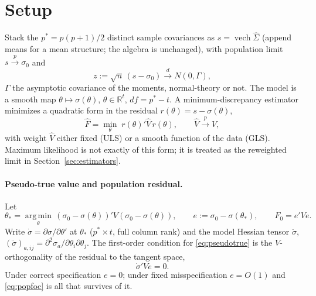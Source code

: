 \documentclass[11pt]{article}
\newcommand{\vech}{\operatorname{vech}}
\newcommand{\argmin}{\operatorname*{arg\,min}}
\newcommand{\dto}{\xrightarrow{d}}
\newcommand{\pto}{\xrightarrow{p}}
\theoremstyle{plain}
\theoremstyle{remark}
\begin{document}
\section{Setup}\label{sec:setup}

Stack the $p^\ast=p(p{+}1)/2$ distinct sample covariances as $s=\vech\hat\Sigma$
(append means for a mean structure; the algebra is unchanged), with population
limit $s\pto\sigma_0$ and
\begin{equation}\label{eq:clt}
  z := \sqrt n\,(s-\sigma_0)\dto N(0,\Gamma),
\end{equation}
$\Gamma$ the asymptotic covariance of the moments, normal-theory or not. The
model is a smooth map $\theta\mapsto\sigma(\theta)$, $\theta\in\mathbb R^t$,
$df=p^\ast-t$. A minimum-discrepancy estimator minimizes a quadratic form in the
residual $r(\theta)=s-\sigma(\theta)$,
\begin{equation}\label{eq:disc}
  \hat F = \min_\theta\; r(\theta)'\hat V\,r(\theta),
  \qquad \hat V\pto V,
\end{equation}
with weight $\hat V$ either fixed (ULS) or a smooth function of the data (GLS).
Maximum likelihood is not exactly of this form; it is treated as the reweighted
limit in Section~\ref{sec:estimators}.

\paragraph{Pseudo-true value and population residual.}
Let
\begin{equation}\label{eq:pseudotrue}
  \theta_\ast = \argmin_\theta\,(\sigma_0-\sigma(\theta))'V(\sigma_0-\sigma(\theta)),
  \qquad e := \sigma_0-\sigma(\theta_\ast),\qquad F_0=e'Ve.
\end{equation}
Write $\dot\sigma=\partial\sigma/\partial\theta'$ at $\theta_\ast$
($p^\ast\times t$, full column rank) and the model Hessian tensor
$\ddot\sigma$, $(\ddot\sigma)_{a,ij}=\partial^2\sigma_a/\partial\theta_i\partial\theta_j$.
The first-order condition for \eqref{eq:pseudotrue} is the $V$-orthogonality of
the residual to the tangent space,
\begin{equation}\label{eq:popfoc}
  \dot\sigma'V e = 0 .
\end{equation}
Under correct specification $e=0$; under fixed misspecification $e=O(1)$ and
\eqref{eq:popfoc} is all that survives of it.
\end{document}
